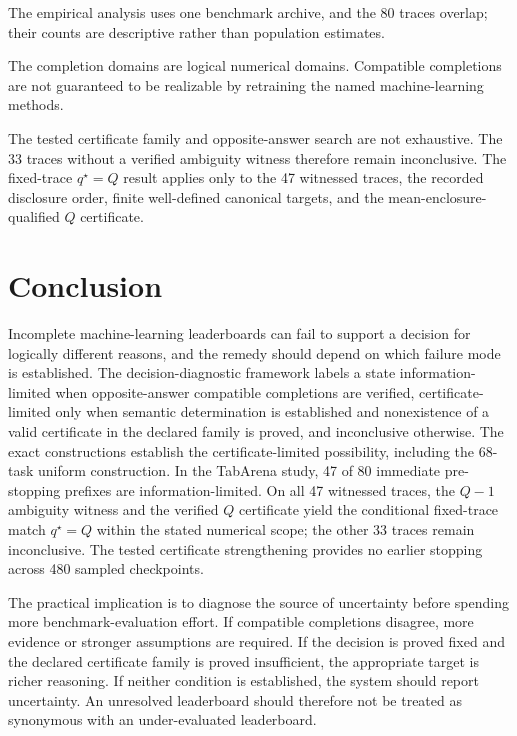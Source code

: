 \documentclass[preprint,11pt]{elsarticle}
\begin{document}
The empirical analysis uses one benchmark archive, and the 80 traces overlap; their counts are descriptive rather than population estimates.

The completion domains are logical numerical domains. Compatible completions are not guaranteed to be realizable by retraining the named machine-learning methods.

The tested certificate family and opposite-answer search are not exhaustive. The 33 traces without a verified ambiguity witness therefore remain inconclusive. The fixed-trace $q^\star=Q$ result applies only to the 47 witnessed traces, the recorded disclosure order, finite well-defined canonical targets, and the mean-enclosure-qualified $Q$ certificate.

\section{Conclusion}

Incomplete machine-learning leaderboards can fail to support a decision for logically different reasons, and the remedy should depend on which failure mode is established. The decision-diagnostic framework labels a state information-limited when opposite-answer compatible completions are verified, certificate-limited only when semantic determination is established and nonexistence of a valid certificate in the declared family is proved, and inconclusive otherwise. The exact constructions establish the certificate-limited possibility, including the 68-task uniform construction. In the TabArena study, 47 of 80 immediate pre-stopping prefixes are information-limited. On all 47 witnessed traces, the $Q-1$ ambiguity witness and the verified $Q$ certificate yield the conditional fixed-trace match $q^\star=Q$ within the stated numerical scope; the other 33 traces remain inconclusive. The tested certificate strengthening provides no earlier stopping across 480 sampled checkpoints.

The practical implication is to diagnose the source of uncertainty before spending more benchmark-evaluation effort. If compatible completions disagree, more evidence or stronger assumptions are required. If the decision is proved fixed and the declared certificate family is proved insufficient, the appropriate target is richer reasoning. If neither condition is established, the system should report uncertainty. An unresolved leaderboard should therefore not be treated as synonymous with an under-evaluated leaderboard.
\end{document}
